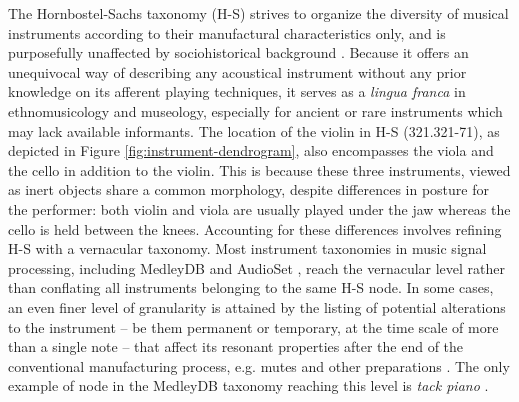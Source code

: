 \documentclass{article}
\makeatletter
\newcommand*{\eg}{e.g.\@\xspace}
\makeatother
\begin{document}
The Hornbostel-Sachs taxonomy (H-S) strives to organize the diversity of musical instruments according to their manufactural characteristics only, and is purposefully unaffected by sociohistorical background \cite{montagu2009muzyka}.
Because it offers an unequivocal way of describing any acoustical instrument without any prior knowledge on its afferent playing techniques, it serves as a \emph{lingua franca} in ethnomusicology and museology, especially for ancient or rare instruments which may lack available informants.
The location of the violin in H-S (321.321-71), as depicted in Figure \ref{fig:instrument-dendrogram}, also encompasses the viola and the cello in addition to the violin.
This is because these three instruments, viewed as inert objects share a common morphology, despite differences in posture for the performer: both violin and viola are usually played under the jaw whereas the cello is held between the knees.
Accounting for these differences involves refining H-S with a vernacular taxonomy.
Most instrument taxonomies in music signal processing, including MedleyDB and AudioSet \cite{gemmeke2017icassp}, reach the vernacular level rather than conflating all instruments belonging to the same H-S node.
In some cases, an even finer level of granularity is attained by the listing of potential alterations to the instrument -- be them permanent or temporary, at the time scale of more than a single note -- that affect its resonant properties after the end of the conventional manufacturing process, \eg{} mutes and other preparations \cite{dianova2007phd}.
The only example of node in the MedleyDB taxonomy reaching this level is \emph{tack piano} \cite{bittner2014ismir} .
\end{document}

